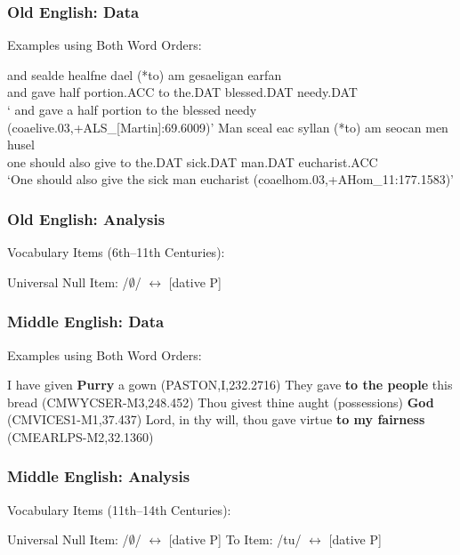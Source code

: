 \documentclass{beamer}
\begin{document}
\begin{frame}
	\frametitle{Old English: Data}
	\begin{exe}
		\ex Examples using Both Word Orders:
		\begin{xlist}
			\ex \gll and sealde healfne dael (*to) \TH am gesaeligan \TH earfan\\
			and gave half portion.ACC to the.DAT blessed.DAT needy.DAT\\
			\trans ` and gave a half portion to the blessed needy (coaelive.03,+ALS\_[Martin]:69.6009)'
			\ex \gll Man sceal eac syllan (*to) \TH am seocan men husel\\
			one should also give to the.DAT sick.DAT man.DAT eucharist.ACC\\
			\trans `One should also give the sick man eucharist (coaelhom.03,+AHom\_11:177.1583)'
		\end{xlist}
	\end{exe}
\end{frame}

\begin{frame}
	\frametitle{Old English: Analysis}
	\begin{exe}
		\ex Vocabulary Items (6th--11th Centuries):\label{ex:old-eng-vi}
		\begin{xlist}
			\ex Universal Null Item:  /$\emptyset$/ $\leftrightarrow$ [dative P]
		\end{xlist}
	\end{exe}
\end{frame}

\begin{frame}
	\frametitle{Middle English: Data}
	\begin{exe}
		\ex Examples using Both Word Orders:
		\begin{xlist}
		\ex I have given \textbf{Purry} a gown (PASTON,I,232.2716)
		\ex They gave \textbf{to the people} this bread (CMWYCSER-M3,248.452)\label{ex:mideng-rt-to}
		\ex Thou givest thine aught (possessions) \textbf{God} (CMVICES1-M1,37.437)
		\ex Lord, in thy will, thou gave virtue \textbf{to my fairness} (CMEARLPS-M2,32.1360)
	\end{xlist}
	\end{exe}
\end{frame}

\begin{frame}
	\frametitle{Middle English: Analysis}
	\begin{exe}
		\ex Vocabulary Items (11th--14th Centuries):\label{ex:simple-vis-eng}
		\begin{xlist}
			\ex Universal Null Item: /$\emptyset$/ $\leftrightarrow$ [dative P]
			\ex To Item: /tu/ $\leftrightarrow$ [dative P]
		\end{xlist}
	\end{exe}
\end{frame}
\end{document}
